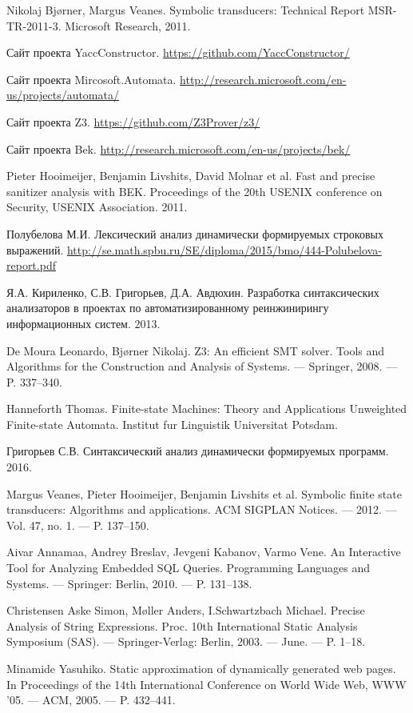 \begin{thebibliography}{99}

  Nikolaj Bj{\o}rner, Margus Veanes.
  Symbolic transducers: Technical Report MSR-TR-2011-3.
  Microsoft Research, 2011.

    Сайт проекта YaccConstructor.
    \url{ https://github.com/YaccConstructor/ }

    Сайт проекта Mircosoft.Automata.
    \url{ http://research.microsoft.com/en-us/projects/automata/ }

    Сайт проекта Z3.
    \url{ https://github.com/Z3Prover/z3/ }

    Сайт проекта Bek.
    \url{ http://research.microsoft.com/en-us/projects/bek/ }

  Pieter Hooimeijer, Benjamin Livshits, David Molnar et al.
  Fast and precise sanitizer analysis with BEK. 
  Proceedings of the 20th USENIX conference on Security, USENIX Association. 2011.

  Полубелова М.И. 
  Лексический анализ динамически формируемых строковых выражений.
  \url{http://se.math.spbu.ru/SE/diploma/2015/bmo/444-Polubelova-report.pdf}



  Я.А. Кириленко, С.В. Григорьев, Д.А. Авдюхин. 
  Разработка синтаксических анализаторов в проектах по автоматизированному реинжинирингу информационных систем. 
  2013. 

  De Moura Leonardo, Bj{\o}rner Nikolaj. 
  Z3: An efficient SMT solver.
  Tools and Algorithms for the Construction and Analysis of Systems. –– Springer, 2008. –– P. 337–340.

  Hanneforth Thomas. 
  Finite-state Machines: Theory and Applications Unweighted Finite-state Automata.
  Institut fur Linguistik Universitat Potsdam.


  Григорьев С.В.
  Синтаксический анализ динамически формируемых программ.
  2016.

  Margus Veanes, Pieter Hooimeijer, Benjamin Livshits et al.
  Symbolic finite state transducers: Algorithms and applications.
  ACM SIGPLAN Notices. –– 2012. –– Vol. 47, no. 1. –– P. 137–150.  

  Aivar Annamaa, Andrey Breslav, Jevgeni Kabanov, Varmo Vene.
  An Interactive Tool for Analyzing Embedded SQL Queries. 
  Programming Languages and Systems. –– Springer: Berlin, 2010. –– P. 131–138.

  Christensen Aske Simon, M{\o}ller Anders, I.Schwartzbach Michael.
  Precise Analysis of String Expressions. 
  Proc. 10th International Static Analysis Symposium (SAS). –– Springer-Verlag: Berlin, 2003. ––  June. –– P. 1–18.

  Minamide Yasuhiko.
  Static approximation of dynamically generated web pages.
  In Proceedings of the 14th International Conference on World Wide Web, WWW ’05. –– ACM, 2005. –– P. 432–441.

\end{thebibliography}

